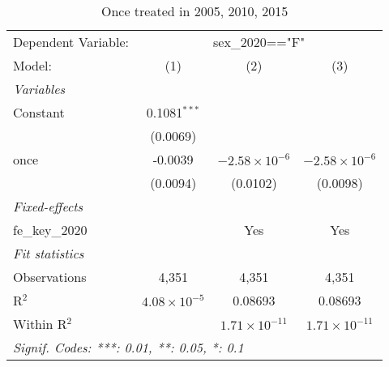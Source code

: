 
\begin{table}[htbp]
   \caption{Once treated in 2005, 2010, 2015}
   \centering
   \begin{tabular}{lccc}
      \tabularnewline \midrule \midrule
      Dependent Variable: & \multicolumn{3}{c}{sex\_2020=="F"}\\
      Model:          & (1)                   & (2)                    & (3)\\  
      \midrule
      \emph{Variables}\\
      Constant        & 0.1081$^{***}$        &                        &   \\   
                      & (0.0069)              &                        &   \\   
      once            & -0.0039               & $-2.58\times 10^{-6}$  & $-2.58\times 10^{-6}$\\    
                      & (0.0094)              & (0.0102)               & (0.0098)\\   
      \midrule
      \emph{Fixed-effects}\\
      fe\_key\_2020   &                       & Yes                    & Yes\\  
      \midrule
      \emph{Fit statistics}\\
      Observations    & 4,351                 & 4,351                  & 4,351\\  
      R$^2$           & $4.08\times 10^{-5}$  & 0.08693                & 0.08693\\  
      Within R$^2$    &                       & $1.71\times 10^{-11}$  & $1.71\times 10^{-11}$\\   
      \midrule \midrule
      \multicolumn{4}{l}{\emph{Signif. Codes: ***: 0.01, **: 0.05, *: 0.1}}\\
   \end{tabular}
\end{table}


